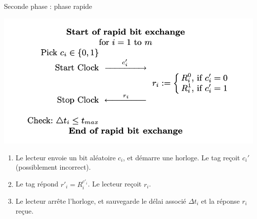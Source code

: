 \documentclass[aspectratio=169]{beamer}
\begin{document}
\begin{frame}{Seconde phase : phase rapide}
  \begin{multicols}{2}
    \begin{minipage}[c]{\linewidth}
      \centering
      \bigskip
      \includegraphics[width=\linewidth]{assets/sk-phase2.png}
    \end{minipage}

    \begin{minipage}[t]{\linewidth}
      \begin{enumerate}
        \item Le lecteur envoie un bit aléatoire $c_i$, et démarre une horloge. Le tag reçoit $c_i'$ (possiblement incorrect).
        \item Le tag répond $r'_i = R_i^{c'_i}$. Le lecteur reçoit $r_i$.
        \item Le lecteur arrête l'horloge, et sauvegarde le délai associé $\Delta t_i$ et la réponse $r_i$ reçue.
      \end{enumerate}
    \end{minipage}
  \end{multicols}
\end{frame}
\end{document}
